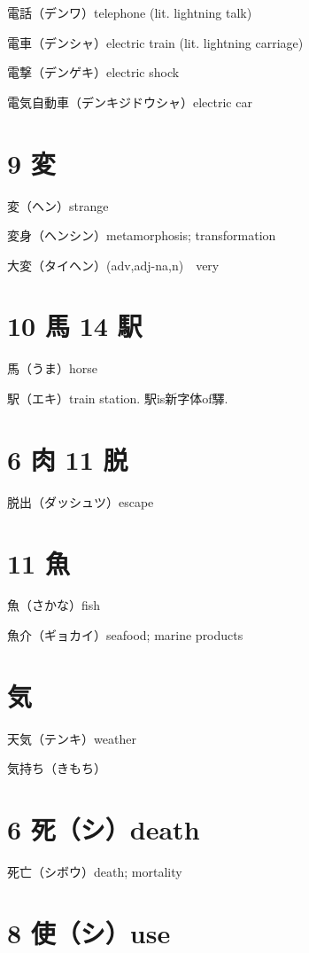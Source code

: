電話（デンワ）telephone (lit. lightning talk)

電車（デンシャ）electric train (lit. lightning carriage)

電撃（デンゲキ）electric shock

電気自動車（デンキジドウシャ）electric car

\section{9 変}

変（ヘン）strange

変身（ヘンシン）metamorphosis; transformation

大変（タイヘン）(adv,adj-na,n)　very

\section{10 馬 14 駅}

馬（うま）horse

駅（エキ）train station. 駅is新字体of驛.

\section{6 肉 11 脱}

脱出（ダッシュツ）escape

\section{11 魚}

魚（さかな）fish

魚介（ギョカイ）seafood; marine products

\section{気}

天気（テンキ）weather

気持ち（きもち）

\section{6 死（シ）death}

死亡（シボウ）death; mortality

\section{8 使（シ）use}

